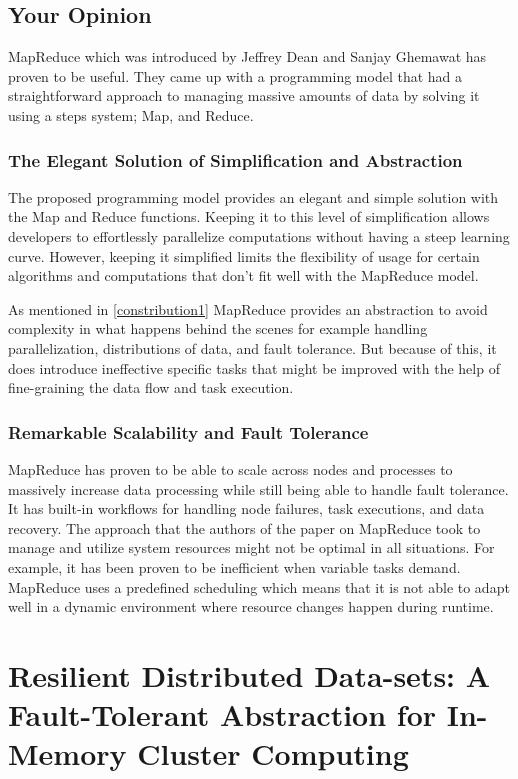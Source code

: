 \documentclass[10pt]{proc}
\begin{document}
\subsection{Your Opinion}
MapReduce which was introduced by Jeffrey Dean and Sanjay Ghemawat has proven to be useful. They came up with a programming model that had a straightforward approach to managing massive amounts of data by solving it using a steps system; Map, and Reduce.

\subsubsection{The Elegant Solution of Simplification and Abstraction}
The proposed programming model provides an elegant and simple solution with the Map and Reduce functions. Keeping it to this level of simplification allows developers to effortlessly parallelize computations without having a steep learning curve. However, keeping it simplified limits the flexibility of usage for certain algorithms and computations that don't fit well with the MapReduce model.

As mentioned in \ref{constribution1} MapReduce provides an abstraction to avoid complexity in what happens behind the scenes for example handling parallelization, distributions of data, and fault tolerance. But because of this, it does introduce ineffective specific tasks that might be improved with the help of fine-graining the data flow and task execution.

\subsubsection{Remarkable Scalability and Fault Tolerance}
MapReduce has proven to be able to scale across nodes and processes to massively increase data processing while still being able to handle fault tolerance. It has built-in workflows for handling node failures, task executions, and data recovery. The approach that the authors of the paper on MapReduce took to manage and utilize system resources might not be optimal in all situations. For example, it has been proven to be inefficient when variable tasks demand. MapReduce uses a predefined scheduling which means that it is not able to adapt well in a dynamic environment where resource changes happen during runtime.


\section{Resilient Distributed Data-sets: A Fault-Tolerant Abstraction for In-Memory Cluster Computing}
\end{document}
